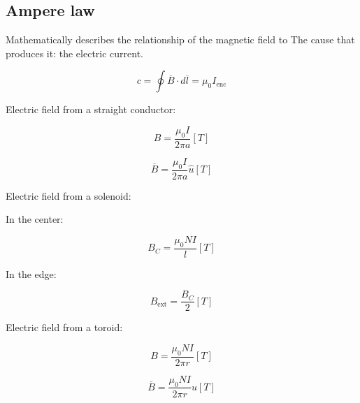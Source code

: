 \documentclass[letterpaper]{article}
\newcommand{\divline}{\noindent\makebox[\linewidth]{\rule{\textwidth}{0.4pt}}}
\begin{document}
    \begin{multicols}{2}
        \section{Ampere law}

        Mathematically describes the relationship of the magnetic field to The cause that produces it: the electric current.

        \[c = \oint \overline{B} \cdot d \overline{l} = \mu_0 I_{\text{enc}}\]

        Electric field from a straight conductor:

        \[B = \frac{\mu_0 I}{2 \pi a} [T]\]

        \[\overline{B} = \frac{\mu_0 I}{2 \pi a} \hat{u} [T]\]

        Electric field from a solenoid:

        In the center:

        \[B_C = \frac{\mu_0 N I}{l} [T]\]

        In the edge:

        \[B_{\text{ext}} = \frac{B_C}{2} [T]\]

        Electric field from a toroid:

        \[B = \frac{\mu_0 N I}{2 \pi r} [T]\]
        
        \[\overline{B} = \frac{\mu_0 N I}{2 \pi r} \hat{u} [T]\]
        
    \end{multicols}
    \divline
    
\end{document}

